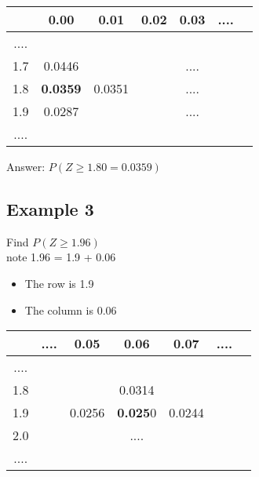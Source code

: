 \documentclass[a4paper,12pt]{article}
\begin{document}
{
\begin{table}[ht]


\centering %
\begin{tabular}{|c|| c c c c c c|} %
\hline
& 0.00& 0.01& 0.02& 0.03& ....&  \\ \hline
....&&& && & \\ \hline
1.7& 0.0446& & & ....& &\\ \hline
1.8& \textbf{0.0359}& 0.0351& & ....& & \\ \hline
1.9& 0.0287&&& ....& & \\ \hline
....&&&&& &\\ \hline
\hline %
\end{tabular}
\end{table}
}

\noindent Answer:  $P(Z \geq 1.80 = 0.0359)$





\subsection*{Example 3}  

Find  $P(Z \geq 1.96)$\\ 

note  1.96 = 1.9 + 0.06


\begin{itemize}
\item The row is 1.9
\item The column is 0.06
\end{itemize}


{
\begin{table}[ht]

\centering %
\begin{tabular}{|c|| c c c c c c|} %
\hline
&....&0.05&0.06&0.07&....& \\ \hline
....&&&&&  &   \\ \hline
1.8&&&0.0314&&&     \\ \hline
1.9&&0.0256&\textbf{0.025}0&0.0244&&     \\ \hline
2.0&&&....&& &   \\ \hline
....&&&&&&\\ \hline
\end{tabular}
\end{table}
}
\end{document}
